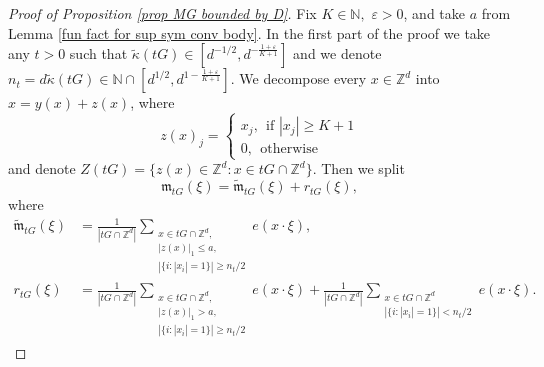 \documentclass[a4paper,oneside, reqno]{amsart}
\numberwithin{equation}{section}
\theoremstyle{definition}%
\theoremstyle{definition}
\theoremstyle{definition}%
\theoremstyle{definition}
\newcommand{\Z}{\mathbb{Z}}
\newcommand{\N}{\mathbb{N}}
\begin{document}
\begin{proof}[Proof of Proposition \ref{prop MG bounded by D}] Fix $K \in \N,$  $\varepsilon>0$, and take $a$ from Lemma \ref{fun fact for sup sym conv body}. In the first part of the proof we take any $t>0$ such that $\widetilde{\kappa}(tG) \in [d^{-1/2}, d^{-\frac{1+\varepsilon}{K+1}}]$ and we denote $n_t=d \widetilde{\kappa}(tG) \in \N \cap [d^{1/2}, d^{1-\frac{1+\varepsilon}{K+1}}]$. We decompose every $x \in \Z^d$ into $x=y(x)+z(x)$, where
\[
z(x)_j= \begin{cases}
    x_j, \ \ \text{if $|x_j| \geq K+1$} \\
    0, \ \ \text{otherwise}
\end{cases}
\]
and denote $Z(tG)=\{z(x) \in \Z^d: x \in tG \cap \Z^d\}.$ Then we split
\[
\mathfrak{m}_{tG}(\xi)=\widetilde{\mathfrak{m}}_{tG}(\xi)+r_{tG}(\xi),
\]
where
\begin{align*}
\widetilde{\mathfrak{m}}_{tG}(\xi)&=\frac{1}{|tG \cap \Z^d|} \sum_{\substack{x \in tG \cap \Z^d, \\ |z(x)|_1 \le a, \\ |\{i: |x_i|=1\} | \geq n_t/2}} e(x \cdot \xi),
\\
r_{tG}(\xi)&=\frac{1}{|tG \cap \Z^d|} \sum_{\substack{x \in tG \cap \Z^d, \\ |z(x)|_1>a, \\ |\{i: |x_i|=1\} | \ge n_t/2}} e(x \cdot \xi) + \frac{1}{|tG \cap \Z^d|} \sum_{\substack{x \in tG \cap \Z^d \\ |\{i: |x_i|=1\} | < n_t/2}} e(x \cdot \xi).
\end{align*}










\end{proof}
\end{document}
